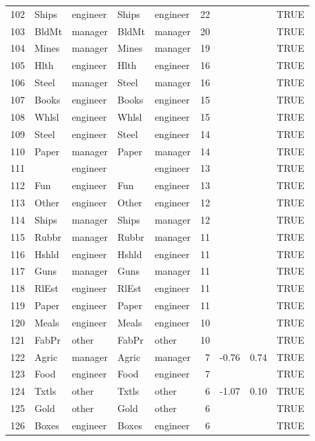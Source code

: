 \begin{table}[ht]
\begin{tabular}{rllllrrrl}
  102 & Ships & engineer & Ships & engineer &  22 &  &  & TRUE \\ 
  103 & BldMt & manager & BldMt & manager &  20 &  &  & TRUE \\ 
  104 & Mines & manager & Mines & manager &  19 &  &  & TRUE \\ 
  105 & Hlth & engineer & Hlth & engineer &  16 &  &  & TRUE \\ 
  106 & Steel & manager & Steel & manager &  16 &  &  & TRUE \\ 
  107 & Books & engineer & Books & engineer &  15 &  &  & TRUE \\ 
  108 & Whlsl & engineer & Whlsl & engineer &  15 &  &  & TRUE \\ 
  109 & Steel & engineer & Steel & engineer &  14 &  &  & TRUE \\ 
  110 & Paper & manager & Paper & manager &  14 &  &  & TRUE \\ 
  111 &  & engineer &  & engineer &  13 &  &  & TRUE \\ 
  112 & Fun & engineer & Fun & engineer &  13 &  &  & TRUE \\ 
  113 & Other & engineer & Other & engineer &  12 &  &  & TRUE \\ 
  114 & Ships & manager & Ships & manager &  12 &  &  & TRUE \\ 
  115 & Rubbr & manager & Rubbr & manager &  11 &  &  & TRUE \\ 
  116 & Hshld & engineer & Hshld & engineer &  11 &  &  & TRUE \\ 
  117 & Guns & manager & Guns & manager &  11 &  &  & TRUE \\ 
  118 & RlEst & engineer & RlEst & engineer &  11 &  &  & TRUE \\ 
  119 & Paper & engineer & Paper & engineer &  11 &  &  & TRUE \\ 
  120 & Meals & engineer & Meals & engineer &  10 &  &  & TRUE \\ 
  121 & FabPr & other & FabPr & other &  10 &  &  & TRUE \\ 
  122 & Agric & manager & Agric & manager &   7 & -0.76 & 0.74 & TRUE \\ 
  123 & Food & engineer & Food & engineer &   7 &  &  & TRUE \\ 
  124 & Txtls & other & Txtls & other &   6 & -1.07 & 0.10 & TRUE \\ 
  125 & Gold & other & Gold & other &   6 &  &  & TRUE \\ 
  126 & Boxes & engineer & Boxes & engineer &   6 &  &  & TRUE \\ 

\end{tabular}
\end{table}
